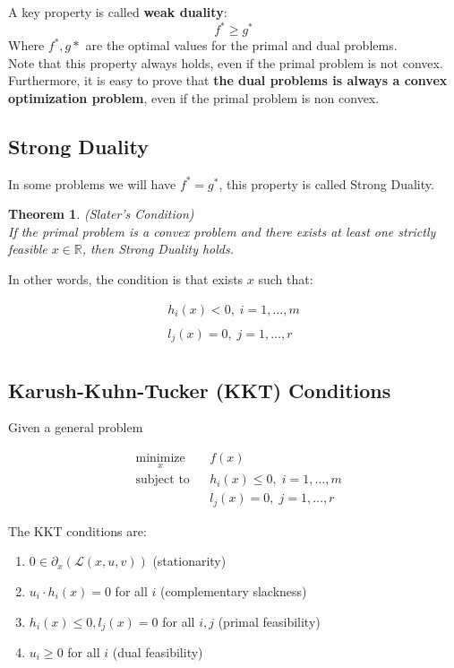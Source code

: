 \documentclass[twoside]{article}
\newcounter{lecnum}
\newtheorem{theorem}{Theorem}[lecnum]
\begin{document}
 A key property is called \textbf{weak duality}: 
\begin{equation*}
    f^{*} \geq g^{*}
\end{equation*}
Where $f^{*},g{*}$ are the optimal values for the primal and dual problems.\\Note that this property always holds, even if the primal problem is not convex. Furthermore, it is easy to prove that  \textbf{the dual problems is always a convex optimization problem}, even if the primal problem is non convex.

\newpage
\subsection{Strong Duality}
In some problems we will have $f^{*}=g^{*}$, this property is called Strong Duality.

\begin{theorem}{(Slater's Condition)}
\\If the primal problem is a convex problem
and there exists at least one strictly feasible $x \in \mathbb{R} $, then Strong Duality holds.
\end{theorem}

In other words, the condition is that exists $x$ such that:

\begin{align*}
       h_i(x) < 0, \; i = 1, \ldots, m \\\\        
    l_j (x) = 0,\; j = 1, \ldots, r \\ 
\end{align*}



\subsection{Karush-Kuhn-Tucker (KKT) Conditions}

Given a general problem

\begin{equation*}
\begin{aligned}
& \underset{x}{\text{minimize}}
& & f(x) \\
& \text{subject to}
& & h_i(x) \leq 0, \; i = 1, \ldots, m \\
&&& l_j(x) =  0, \; j = 1, \ldots, r
\end{aligned}
\end{equation*}

The KKT conditions are:
\begin{enumerate}
    \item $0 \in \partial_x (\mathcal{L}(x, u, v)  )$ (stationarity)
    \item $u_i \cdot h_i(x) = 0$ for all $i$ (complementary slackness)
    \item $h_i(x) \leq 0,  l_j(x)  = 0$ for all $i,j$ (primal feasibility)
    \item $u_i \geq 0$ for all $i$ (dual feasibility)
\end{enumerate}
\end{document}
